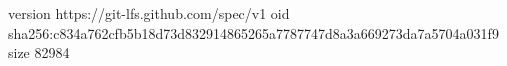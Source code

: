 version https://git-lfs.github.com/spec/v1
oid sha256:c834a762cfb5b18d73d832914865265a7787747d8a3a669273da7a5704a031f9
size 82984
